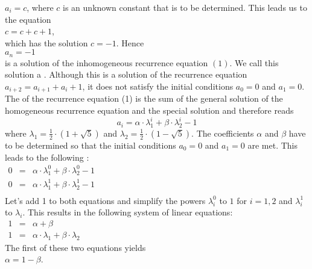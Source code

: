 $a_i = c$, where $c$ is an unknown constant that is to be determined.  This leads us to the equation \\[0.2cm] 
\hspace*{1.3cm}
$c = c + c + 1$,
\\[0.2cm]
which has the solution $c = -1$.  Hence
\\[0.2cm]
\hspace*{1.3cm}
$a_n = -1$ 
\\[0.2cm]
is a solution of the inhomogeneous recurrence equation $(1)$. We call this solution a .
  Although this is a solution of the recurrence equation $a_{i+2} = a_{i+1} + a_i + 1$,
it does not satisfy the initial conditions $a_0 = 0$ and $a_1 = 0$.
The   of the recurrence equation (1) 
is the sum of the general solution of the homogeneous recurrence equation and the special
solution and therefore reads 
\[ a_i = \alpha \cdot \lambda_1^i + \beta \cdot \lambda_2^i - 1 \]
where $\lambda_1 = \frac{1}{2}\cdot (1 + \sqrt{5})$ and $\lambda_2 = \frac{1}{2}\cdot (1 - \sqrt{5})$.
The coefficients $\alpha$ and $\beta$ have to be determined so that the
initial conditions $a_0 = 0$ and $a_1 = 0$ are met.  This leads to the following
: 
\\[0.2cm]
\hspace*{1.3cm}
$\begin{array}{lcl}
    0 & = & \alpha \cdot \lambda_1^0 + \beta \cdot \lambda_2^0 - 1 \\[0.1cm]
    0 & = & \alpha \cdot \lambda_1^1 + \beta \cdot \lambda_2^1 - 1 \\
  \end{array}
  $
\\[0.2cm]
Let's add 1 to both equations and simplify the powers $\lambda_i^0$ to $1$ for $i=1,2$ and
$\lambda_i^1$ to $\lambda_i$.  This results in the following system of linear equations:
\\[0.2cm]
\hspace*{1.3cm}
$ \begin{array}{lcl}
    1 & = & \alpha + \beta \\[0.1cm]
    1 & = & \alpha \cdot \lambda_1 + \beta \cdot \lambda_2 
  \end{array}
$
\\[0.2cm]
The first of these two equations yields
\\[0.2cm]
\hspace*{1.3cm}
$\alpha = 1 - \beta$.
\\[0.2cm]
